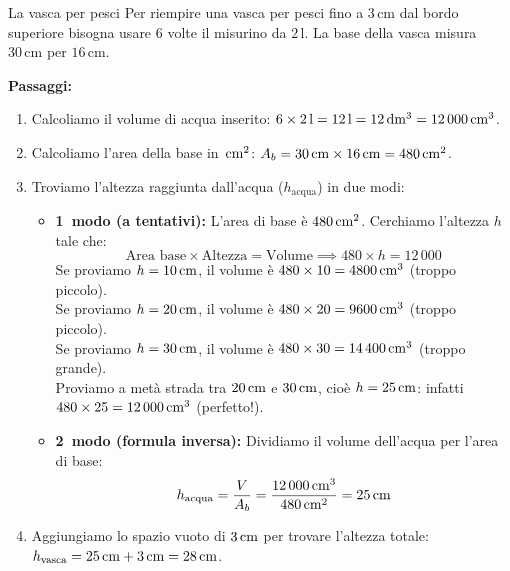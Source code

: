 \begin{esercizio}{La vasca per pesci}
Per riempire una vasca per pesci fino a $3\,\mathrm{cm}$ dal bordo superiore bisogna usare $6$ volte il misurino da $2\,\mathrm{l}$. La base della vasca misura $30\,\mathrm{cm}$ per $16\,\mathrm{cm}$.




\responsespace{6.2cm}
\condnewpage

\begin{soluzione}
  \textbf{Passaggi:}
  \begin{enumerate}
    \item Calcoliamo il volume di acqua inserito: $6 \times 2\,\mathrm{l} = 12\,\mathrm{l} = 12\,\mathrm{dm^3} = 12\,000\,\mathrm{cm^3}$.
    \item Calcoliamo l'area della base in $\,\mathrm{cm^2}$: $A_b = 30\,\mathrm{cm} \times 16\,\mathrm{cm} = 480\,\mathrm{cm^2}$.
    \item Troviamo l'altezza raggiunta dall'acqua ($h_{\text{acqua}}$) in due modi:
    \begin{itemize}
      \item \textbf{1\textdegree\ modo (a tentativi):} L'area di base è $480\,\mathrm{cm^2}$. Cerchiamo l'altezza $h$ tale che:
      \[
      \text{Area base} \times \text{Altezza} = \text{Volume} \implies 480 \times h = 12\,000
      \]
      Se proviamo $h = 10\,\mathrm{cm}$, il volume è $480 \times 10 = 4800\,\mathrm{cm^3}$ (troppo piccolo).\\
      Se proviamo $h = 20\,\mathrm{cm}$, il volume è $480 \times 20 = 9600\,\mathrm{cm^3}$ (troppo piccolo).\\
      Se proviamo $h = 30\,\mathrm{cm}$, il volume è $480 \times 30 = 14\,400\,\mathrm{cm^3}$ (troppo grande).\\
      Proviamo a metà strada tra $20\,\mathrm{cm}$ e $30\,\mathrm{cm}$, cioè $h = 25\,\mathrm{cm}$: infatti $480 \times 25 = 12\,000\,\mathrm{cm^3}$ (perfetto!).
      \item \textbf{2\textdegree\ modo (formula inversa):} Dividiamo il volume dell'acqua per l'area di base:
      \[
      h_{\text{acqua}} = \frac{V}{A_b} = \frac{12\,000\,\mathrm{cm^3}}{480\,\mathrm{cm^2}} = 25\,\mathrm{cm}
      \]
    \end{itemize}
    \item Aggiungiamo lo spazio vuoto di $3\,\mathrm{cm}$ per trovare l'altezza totale: $h_{\text{vasca}} = 25\,\mathrm{cm} + 3\,\mathrm{cm} = 28\,\mathrm{cm}$.
  \end{enumerate}
\end{soluzione}
\end{esercizio}

